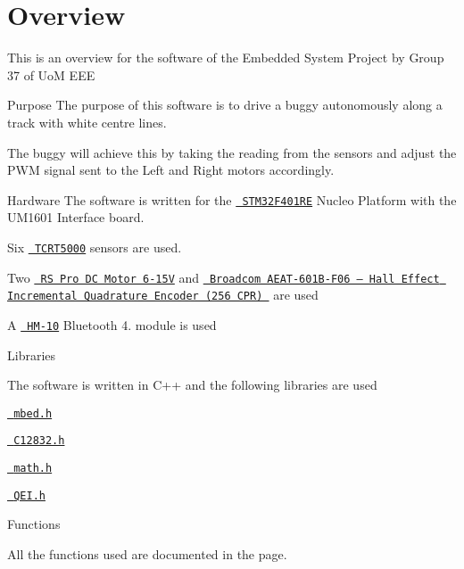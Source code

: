\chapter{Overview}
\hypertarget{index}{}\label{index}
This is an overview for the software of the Embedded System Project by Group 37 of UoM EEE

 Purpose  The purpose of this software is to drive a buggy autonomously along a track with white centre lines.

The buggy will achieve this by taking the reading from the sensors and adjust the PWM signal sent to the Left and Right motors accordingly.

 Hardware  The software is written for the \href{https://www.st.com/en/microcontrollers-microprocessors/stm32f401re.html}{\texttt{ STM32\+F401\+RE}} Nucleo Platform with the UM1601 Interface board.

Six \href{https://www.vishay.com/docs/83760/tcrt5000.pdf}{\texttt{ TCRT5000}} sensors are used.

Two \href{http://uk.rs-online.com/web/p/dc-motors/2389715/}{\texttt{ RS Pro DC Motor 6-\/15V}} and \href{https://www.broadcom.com/products/motion-control-encoders/magnetic-encoders/aeat-601bf06}{\texttt{ Broadcom AEAT-\/601\+B-\/\+F06 – Hall Effect Incremental Quadrature Encoder (256 CPR) }} are used

A \href{https://store.arduino.cc/products/bluetooth-low-energy-4-0-module-hm-10?srsltid=AfmBOope2rM6RkUvddsirgnamtKd3tgoWuPAX5WVlHGSZzU0Z6AIpuno}{\texttt{ HM-\/10}} Bluetooth 4. module is used

 Libraries 

The software is written in C++ and the following libraries are used

\href{https://os.mbed.com/docs/mbed-os/v6.16/feature-i2c-doxy/mbed_8h_source.html}{\texttt{ mbed.\+h}}

\href{https://os.mbed.com/users/askksa12543/code/C12832//file/990d5eec2ef6/C12832.h/}{\texttt{ C12832.\+h}}

\href{https://cplusplus.com/reference/cmath/}{\texttt{ math.\+h}}

\href{https://os.mbed.com/users/aberk/code/QEI/file/5c2ad81551aa/QEI.h/}{\texttt{ QEI.\+h}}

 Functions 

All the functions used are documented in the  page. 